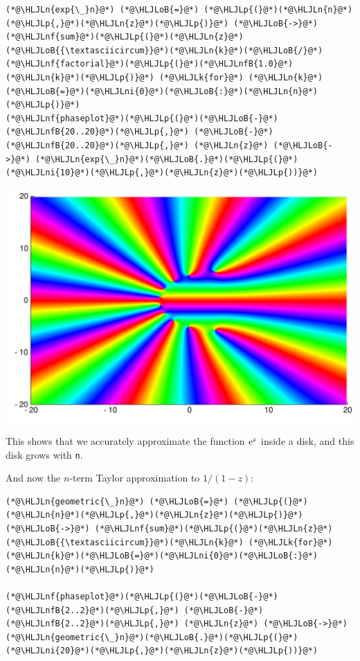 \documentclass[12pt,a4paper]{article}
\newcommand{\HLJLk}[1]{\textcolor[RGB]{148,91,176}{\textbf{#1}}}
\newcommand{\HLJLn}[1]{#1}
\newcommand{\HLJLnf}[1]{\textcolor[RGB]{66,102,213}{#1}}
\newcommand{\HLJLnfB}[1]{\textcolor[RGB]{59,151,46}{#1}}
\newcommand{\HLJLni}[1]{\textcolor[RGB]{59,151,46}{#1}}
\newcommand{\HLJLoB}[1]{\textcolor[RGB]{102,102,102}{\textbf{#1}}}
\newcommand{\HLJLp}[1]{#1}
\def\E{ {\rm e} }
\begin{document}
\begin{lstlisting}
(*@\HLJLn{exp{\_}n}@*) (*@\HLJLoB{=}@*) (*@\HLJLp{(}@*)(*@\HLJLn{n}@*)(*@\HLJLp{,}@*)(*@\HLJLn{z}@*)(*@\HLJLp{)}@*) (*@\HLJLoB{->}@*) (*@\HLJLnf{sum}@*)(*@\HLJLp{(}@*)(*@\HLJLn{z}@*)(*@\HLJLoB{{\textasciicircum}}@*)(*@\HLJLn{k}@*)(*@\HLJLoB{/}@*)(*@\HLJLnf{factorial}@*)(*@\HLJLp{(}@*)(*@\HLJLnfB{1.0}@*)(*@\HLJLn{k}@*)(*@\HLJLp{)}@*) (*@\HLJLk{for}@*) (*@\HLJLn{k}@*)(*@\HLJLoB{=}@*)(*@\HLJLni{0}@*)(*@\HLJLoB{:}@*)(*@\HLJLn{n}@*)(*@\HLJLp{)}@*)
(*@\HLJLnf{phaseplot}@*)(*@\HLJLp{(}@*)(*@\HLJLoB{-}@*)(*@\HLJLnfB{20..20}@*)(*@\HLJLp{,}@*) (*@\HLJLoB{-}@*)(*@\HLJLnfB{20..20}@*)(*@\HLJLp{,}@*) (*@\HLJLn{z}@*) (*@\HLJLoB{->}@*) (*@\HLJLn{exp{\_}n}@*)(*@\HLJLoB{.}@*)(*@\HLJLp{(}@*)(*@\HLJLni{10}@*)(*@\HLJLp{,}@*)(*@\HLJLn{z}@*)(*@\HLJLp{))}@*)
\end{lstlisting}

\includegraphics[width=\linewidth]{figures/Lecture2_5_1.pdf}

This shows that we accurately approximate the function $\E^z$ inside a disk, and this disk grows with \texttt{n}. 

And now the $n$-term Taylor approximation to $1/(1-z)$:


\begin{lstlisting}
(*@\HLJLn{geometric{\_}n}@*) (*@\HLJLoB{=}@*) (*@\HLJLp{(}@*)(*@\HLJLn{n}@*)(*@\HLJLp{,}@*)(*@\HLJLn{z}@*)(*@\HLJLp{)}@*) (*@\HLJLoB{->}@*) (*@\HLJLnf{sum}@*)(*@\HLJLp{(}@*)(*@\HLJLn{z}@*)(*@\HLJLoB{{\textasciicircum}}@*)(*@\HLJLn{k}@*) (*@\HLJLk{for}@*) (*@\HLJLn{k}@*)(*@\HLJLoB{=}@*)(*@\HLJLni{0}@*)(*@\HLJLoB{:}@*)(*@\HLJLn{n}@*)(*@\HLJLp{)}@*)

(*@\HLJLnf{phaseplot}@*)(*@\HLJLp{(}@*)(*@\HLJLoB{-}@*)(*@\HLJLnfB{2..2}@*)(*@\HLJLp{,}@*) (*@\HLJLoB{-}@*)(*@\HLJLnfB{2..2}@*)(*@\HLJLp{,}@*) (*@\HLJLn{z}@*) (*@\HLJLoB{->}@*) (*@\HLJLn{geometric{\_}n}@*)(*@\HLJLoB{.}@*)(*@\HLJLp{(}@*)(*@\HLJLni{20}@*)(*@\HLJLp{,}@*)(*@\HLJLn{z}@*)(*@\HLJLp{))}@*)
\end{lstlisting}
\end{document}
